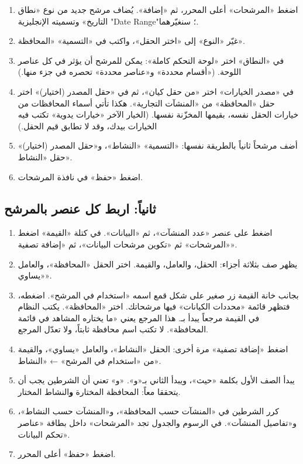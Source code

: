 \begin{enumerate}
\item اضغط «المرشحات» أعلى المحرر، ثم «إضافة». يُضاف مرشح جديد من نوع «نطاق التاريخ» وتسميته الإنجليزية "Date Range"؛ سنغيّرهما.
\item غيّر «النوع» إلى «اختر الحقل»، واكتب في «التسمية» «المحافظة».
\item في «النطاق» اختر «لوحة التحكم كاملة»: يمكن للمرشح أن يؤثر في كل عناصر اللوحة. («أقسام محددة» و«عناصر محددة» تحصره في جزء منها.)
\item في «مصدر الخيارات» اختر «من حقل كيان»، ثم في «حقل المصدر (اختيار)» اختر حقل «المحافظة» من «المنشآت التجارية». هكذا تأتي أسماء المحافظات من خيارات الحقل نفسه، بقيمها المخزّنة نفسها. (الخيار الآخر «خيارات يدوية» تكتب فيه الخيارات بيدك، وقد لا تطابق قيم الحقل.)
\item أضف مرشحاً ثانياً بالطريقة نفسها: «التسمية» «النشاط»، و«حقل المصدر (اختيار)» حقل «النشاط».
\item اضغط «حفظ» في نافذة المرشحات.
\end{enumerate}

\subsection{ثانياً: اربط كل عنصر بالمرشح}

\begin{enumerate}
\item اضغط على عنصر «عدد المنشآت»، ثم «البيانات». في كتلة «القيمة» اضغط «المرشحات» ثم «تكوين مرشحات البيانات»، ثم «إضافة تصفية».
\item يظهر صف بثلاثة أجزاء: الحقل، والعامل، والقيمة. اختر الحقل «المحافظة»، والعامل «يساوي».
\item بجانب خانة القيمة زر صغير على شكل قمع اسمه «استخدام في المرشح». اضغطه، فتظهر قائمة «محددات الكيانات» فيها مرشحاتك. اختر «المحافظة». يكتب النظام في القيمة مرجعاً يبدأ بـ. هذا المرجع يعني «ما يختاره المشاهد في قائمة المحافظة». لا تكتب اسم محافظة ثابتاً، ولا تعدّل المرجع.
\item اضغط «إضافة تصفية» مرة أخرى: الحقل «النشاط»، والعامل «يساوي»، والقيمة من «استخدام في المرشح» ← «النشاط».
\item يبدأ الصف الأول بكلمة «حيث»، ويبدأ الثاني بـ«و». «و» تعني أن الشرطين يجب أن يتحققا معاً: المحافظة المختارة \textbf{و}النشاط المختار.
\item كرر الشرطين في «المنشآت حسب المحافظة»، و«المنشآت حسب النشاط»، و«تفاصيل المنشآت». في الرسوم والجدول تجد «المرشحات» داخل بطاقة «عناصر تحكم البيانات».
\item اضغط «حفظ» أعلى المحرر.
\end{enumerate}


